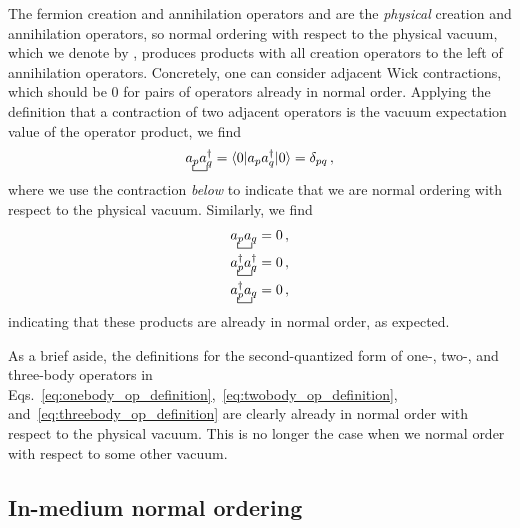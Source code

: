 The fermion creation and annihilation operators  and 
are the \textit{physical} creation and annihilation operators,
so normal ordering with respect to the physical vacuum,
which we denote by \novac{\cdot},
produces products with all creation operators to the left of annihilation operators.
Concretely, one can consider adjacent Wick contractions,
which should be 0 for pairs of operators already in normal order.
Applying the definition that a contraction of two adjacent operators
is the vacuum expectation value of the operator product,
we find
\begin{equation}
  \bcontraction{}{\annih{p}}{}{\crea{q}} \annih{p}\crea{q} = \braket{0|\annih{p} \crea{q} | 0} = \delta_{pq}\,,
\end{equation}
where we use the contraction \textit{below}
to indicate that we are normal ordering with respect to the physical vacuum.
Similarly, we find
\begin{align}
  \bcontraction{}{\annih{p}}{}{\annih{q}} \annih{p}\annih{q} & = 0\,, \\
  \bcontraction{}{\crea{p}}{}{\crea{q}} \crea{p}\crea{q}     & = 0\,, \\
  \bcontraction{}{\crea{p}}{}{\annih{q}} \crea{p}\annih{q}   & = 0\,,
\end{align}
indicating that these products are already in normal order, as expected.

As a brief aside,
the definitions for the second-quantized form of one-, two-, and three-body operators
in Eqs.~\eqref{eq:onebody_op_definition},~\eqref{eq:twobody_op_definition}, and~\eqref{eq:threebody_op_definition}
are clearly already in normal order with respect to the physical vacuum.
This is no longer the case when we normal order with respect to some other vacuum.

\subsection{In-medium normal ordering}

